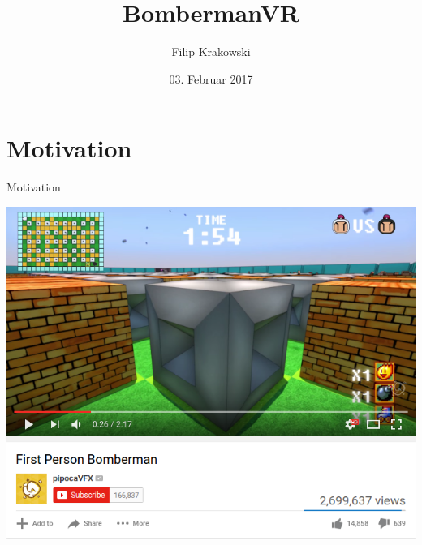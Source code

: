 \documentclass{beamer}
\title{BombermanVR}
\date{03. Februar 2017}
\author{Filip Krakowski}
\institute{Master-Seminar zu Virtueller \& Erweiterter Realität}
\begin{document}
  \maketitle
  
  \section{Motivation}
  \begin{frame}{Motivation}
  	\begin{center}
  		\includegraphics[height=.9\textheight]{bilder/youtube.png}
  	\end{center}
  \end{frame}
  
  
  
%  	
%  	
  
\end{document}
